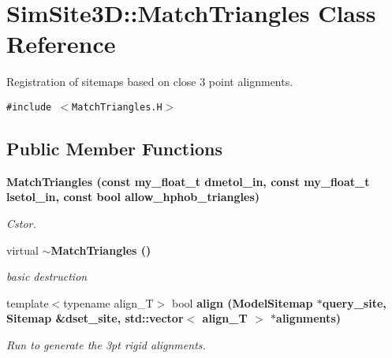 \section{SimSite3D::Match\-Triangles Class Reference}
\label{classSimSite3D_1_1MatchTriangles}
Registration of sitemaps based on close 3 point alignments.  


{\tt \#include $<$Match\-Triangles.H$>$}

\subsection*{Public Member Functions}
\begin{CompactItemize}
\item 
\bf{Match\-Triangles} (const my\_\-float\_\-t dmetol\_\-in, const my\_\-float\_\-t lsetol\_\-in, const bool allow\_\-hphob\_\-triangles)
\begin{CompactList}\small\item\em Cstor. \item\end{CompactList}\item 
virtual \bf{$\sim$Match\-Triangles} ()\label{classSimSite3D_1_1MatchTriangles_2c1b59400cb3b11d304f8ac9fe4446e1}

\begin{CompactList}\small\item\em basic destruction \item\end{CompactList}\item 
template$<$typename align\_\-T$>$ bool \bf{align} (\bf{Model\-Sitemap} $\ast$query\_\-site, \bf{Sitemap} \&dset\_\-site, std::vector$<$ align\_\-T $>$ $\ast$alignments)
\begin{CompactList}\small\item\em Run to generate the 3pt rigid alignments. \item\end{CompactList}\end{CompactItemize}

